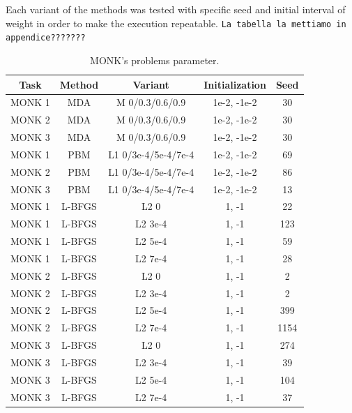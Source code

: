 Each variant of the methods was tested with specific seed and initial interval of weight in order to make the execution repeatable.
\texttt{La tabella la mettiamo in appendice???????}
\begin{center}
	\begin{table}[H]
		\begin{tabular}{|c|c|c|c|c|}
			\hline
			\textbf{Task} &	\textbf{Method} &\textbf{ Variant} & \textbf{Initialization} &\textbf{Seed} \\ \hline
			MONK 1        &    MDA & M  0/0.3/0.6/0.9 & 1e-2, -1e-2 & 30  \\ \hline
			MONK 2        &    MDA & M  0/0.3/0.6/0.9 & 1e-2, -1e-2 & 30  \\ \hline
			MONK 3        &    MDA & M  0/0.3/0.6/0.9 & 1e-2, -1e-2 & 30  \\ \hline			
			MONK 1        &    PBM & L1  0/3e-4/5e-4/7e-4 & 1e-2, -1e-2 & 69  \\ \hline
			MONK 2        &    PBM & L1  0/3e-4/5e-4/7e-4 & 1e-2, -1e-2 & 86  \\ \hline
			MONK 3        &    PBM & L1  0/3e-4/5e-4/7e-4 & 1e-2, -1e-2 & 13  \\ \hline			
			MONK 1        &    L-BFGS & L2  0 & 1, -1 & 22  \\ \hline
			MONK 1        &    L-BFGS & L2  3e-4 & 1, -1 & 123  \\ \hline
			MONK 1        &    L-BFGS & L2  5e-4 & 1, -1 & 59  \\ \hline
			MONK 1        &    L-BFGS & L2  7e-4 & 1, -1 & 28  \\ \hline
			MONK 2        &    L-BFGS & L2  0 & 1, -1 & 2  \\ \hline
			MONK 2        &    L-BFGS & L2  3e-4 & 1, -1 & 2  \\ \hline
			MONK 2        &    L-BFGS & L2  5e-4 & 1, -1 & 399  \\ \hline
			MONK 2        &    L-BFGS & L2  7e-4 & 1, -1 & 1154  \\ \hline
			MONK 3        &    L-BFGS & L2  0 & 1, -1 & 274  \\ \hline
			MONK 3        &    L-BFGS & L2  3e-4 & 1, -1 & 39  \\ \hline
			MONK 3        &    L-BFGS & L2  5e-4 & 1, -1 & 104  \\ \hline
			MONK 3        &    L-BFGS & L2  7e-4 & 1, -1 & 37  \\ \hline
		\end{tabular}
		\caption{MONK's problems parameter.}
		\label{tab:dati}
	\end{table}
\end{center}
